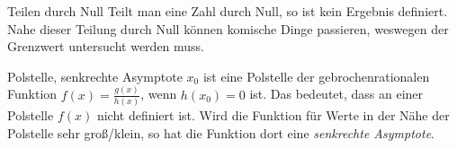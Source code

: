 \begin{bla}{Teilen durch Null}
  Teilt man eine Zahl durch Null, so ist kein Ergebnis definiert. Nahe dieser Teilung durch Null können komische Dinge passieren, weswegen der Grenzwert untersucht werden muss.
\end{bla}

\begin{bla}{Polstelle, senkrechte Asymptote}
  $x_0$ ist eine Polstelle der gebrochenrationalen Funktion $f(x)=\frac{g(x)}{h(x)}$, wenn $h(x_0)=0$ ist. Das bedeutet, dass an einer Polstelle $f(x)$ nicht definiert ist. Wird die Funktion für Werte in der Nähe der Polstelle sehr groß/klein, so hat die Funktion dort eine \emph{senkrechte Asymptote}.
\end{bla}

\begin{marginfigure}
  \caption{$f(x)=\frac{x}{x-1}$ hat eine Polstelle bei $x=1$, da $1-1=0$.}
\end{marginfigure}

